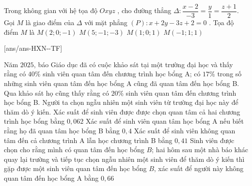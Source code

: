 \begin{ex}%
    Trong không gian với hệ tọa độ $Oxyz$ , cho đường thẳng $\Delta :\dfrac{x-2}{-3}=\dfrac{y}{1}=\dfrac{z+1}{2}$. Gọi $M$ là giao điểm của $\Delta $ với mặt phẳng $(P):x+2y-3z+2=0$ . Tọa độ điểm $M$ là
    \choice
    {$ M\left(2;0;-1\right)$}
    {$ M\left(5;-1;-3\right)$}
    {$ M\left(1;0;1\right)$}
    {\True $ M\left(-1;1;1\right)$}
        \end{ex}
\cauds
{}[ans/ans-HXN-\sode-TF]

\begin{ex}%
    Năm $2025$, báo Giáo dục đã có cuộc khảo sát tại một trường đại học và thấy rằng có $40\%$ sinh viên quan tâm đến chương trình học bổng A; có $17\%$ trong số những sinh viên quan tâm đến học bổng A cũng đã quan tâm đến học bổng B. Qua khảo sát họ cũng thấy rằng có $20\%$ sinh viên quan tâm đến chương trình học bổng B. Người ta chọn ngẫu nhiên một sinh viên từ trường đại học này để thăm dò ý kiến.
    \choiceTF
    {Xác suất để sinh viên được được chọn quan tâm cả hai chương trình học bổng bằng $0{,}062$}
    {Xác suất để sinh viên quan tâm học bổng A nếu biết rằng họ đã quan tâm học bổng B bằng $0{,}4$}
    {Xác suất để sinh viên không quan tâm đến cả chương trình A lẫn học chương trình B bằng $0{,}41$}
    {\True Sinh viên được chọn cho rằng mình có quan tâm đến học bổng $B$; hai hôm sau một nhà báo khác quay lại trường và tiếp tục chọn ngẫu nhiên một sinh viên để thăm dò ý kiến thì gặp được một sinh viên quan tâm đến học bổng $B$, xác suất để người này không quan tâm đến học bổng A bằng $0{,}66$}
\end{ex}
